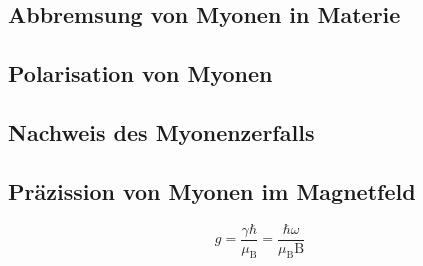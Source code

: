 \documentclass[a4paper,ngerman]{scrartcl}
\begin{document}
\subsection{Abbremsung von Myonen in Materie}
\label{sec:wwmitmaterie}

\subsection{Polarisation von Myonen}
\label{sec:polarisation}




\subsection{Nachweis des Myonenzerfalls}
\label{sec:nachweis}


\subsection{Präzission von Myonen im Magnetfeld}
\label{sec:prazission}
\begin{equation}
g = \frac{\gamma \hbar}{\mu_\mathrm{B}} = \frac{\hbar \omega}{\mu_\mathrm{B}\mathrm{B}}
\end{equation}
\end{document}
